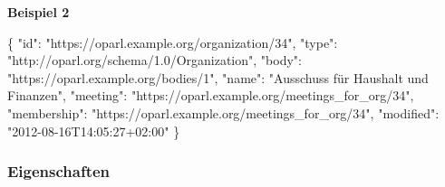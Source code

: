 \documentclass[,a4paper]{article}
\newenvironment{Shaded}{}{}
\newcommand{\DataTypeTok}[1]{\textcolor[rgb]{0.56,0.13,0.00}{{#1}}}
\newcommand{\StringTok}[1]{\textcolor[rgb]{0.25,0.44,0.63}{{#1}}}
\newcommand{\FunctionTok}[1]{\textcolor[rgb]{0.02,0.16,0.49}{{#1}}}
\begin{document}
\textbf{Beispiel 2}

\begin{Shaded}
\begin{Highlighting}[]
\FunctionTok{\{}
    \DataTypeTok{"id"}\FunctionTok{:} \StringTok{"https://oparl.example.org/organization/34"}\FunctionTok{,}
    \DataTypeTok{"type"}\FunctionTok{:} \StringTok{"http://oparl.org/schema/1.0/Organization"}\FunctionTok{,}
    \DataTypeTok{"body"}\FunctionTok{:} \StringTok{"https://oparl.example.org/bodies/1"}\FunctionTok{,}
    \DataTypeTok{"name"}\FunctionTok{:} \StringTok{"Ausschuss für Haushalt und Finanzen"}\FunctionTok{,}
    \DataTypeTok{"meeting"}\FunctionTok{:} \StringTok{"https://oparl.example.org/meetings_for_org/34"}\FunctionTok{,}
    \DataTypeTok{"membership"}\FunctionTok{:} \StringTok{"https://oparl.example.org/meetings_for_org/34"}\FunctionTok{,}
    \DataTypeTok{"modified"}\FunctionTok{:} \StringTok{"2012-08-16T14:05:27+02:00"}
\FunctionTok{\}}
\end{Highlighting}
\end{Shaded}

\subsubsection{Eigenschaften}\label{eigenschaften-2}
\end{document}
